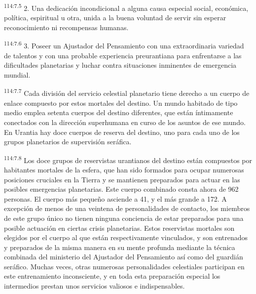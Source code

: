 \par
\textsuperscript{114:7.5} 2. Una dedicación incondicional a alguna causa especial social, económica, política, espiritual u otra, unida a la buena voluntad de servir sin esperar reconocimiento ni recompensas humanas.

\par
\textsuperscript{114:7.6} 3. Poseer un Ajustador del Pensamiento con una extraordinaria variedad de talentos y con una probable experiencia preurantiana para enfrentarse a las dificultades planetarias y luchar contra situaciones inminentes de emergencia mundial.

\par
\textsuperscript{114:7.7} Cada división del servicio celestial planetario tiene derecho a un cuerpo de enlace compuesto por estos mortales del destino. Un mundo habitado de tipo medio emplea setenta cuerpos del destino diferentes, que están íntimamente conectados con la dirección superhumana en curso de los asuntos de ese mundo. En Urantia hay doce cuerpos de reserva del destino, uno para cada uno de los grupos planetarios de supervisión seráfica.

\par
\textsuperscript{114:7.8} Los doce grupos de reservistas urantianos del destino están compuestos por habitantes mortales de la esfera, que han sido formados para ocupar numerosas posiciones cruciales en la Tierra y se mantienen preparados para actuar en las posibles emergencias planetarias. Este cuerpo combinado consta ahora de 962 personas. El cuerpo más pequeño asciende a 41, y el más grande a 172. A excepción de menos de una veintena de personalidades de contacto, los miembros de este grupo único no tienen ninguna conciencia de estar preparados para una posible actuación en ciertas crisis planetarias. Estos reservistas mortales son elegidos por el cuerpo al que están respectivamente vinculados, y son entrenados y preparados de la misma manera en su mente profunda mediante la técnica combinada del ministerio del Ajustador del Pensamiento así como del guardián seráfico. Muchas veces, otras numerosas personalidades celestiales participan en este entrenamiento inconsciente, y en toda esta preparación especial los intermedios prestan unos servicios valiosos e indispensables.

